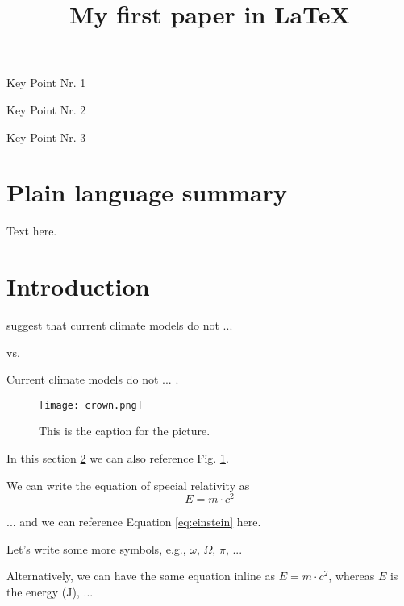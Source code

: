 \documentclass{agujournal2019}
\begin{document}
\title{My first paper in LaTeX}
\begin{keypoints}
\item Key Point Nr. 1
\item Key Point Nr. 2
\item Key Point Nr. 3
\end{keypoints}
\begin{abstract}
\lipsum[5]
\end{abstract} 

\section{Plain language summary}
Text here.
\pagebreak
\section{Introduction} \label{sec:intro}
 suggest that current climate models do not ...

vs. 

Current climate models do not ... \cite{huguenin2020frequency}.

\begin{figure}[!htb] 
    \centering \texttt{[image: crown.png]}
	\caption{This is the caption for the picture.}
	\label{fig:crown}
\end{figure}

In this section \ref{sec:intro} we can also reference Fig. \ref{fig:crown}.

We can write the equation of special relativity as
\begin{equation}
    E = m \cdot c^2
    \label{eq:einstein}
\end{equation}

... and we can reference Equation \ref{eq:einstein} here.

Let's write some more symbols, e.g., $\omega$, $\Omega$, $\pi$, ...

Alternatively, we can have the same equation inline as $E = m \cdot c^2$, whereas $E$ is the energy (J), ...
\end{document}
